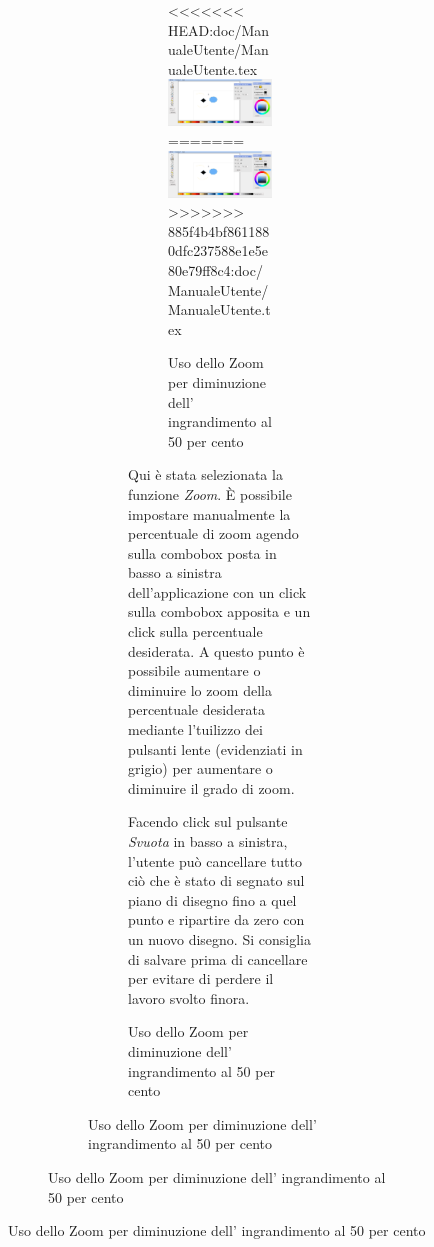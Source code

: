 \begin{figure}[!ht]
\begin{figure}[!ht]
\begin{figure}[!ht]
\begin{figure}[!ht]
\begin{figure}[!ht]
\centering
<<<<<<< HEAD:doc/ManualeUtente/ManualeUtente.tex
\includegraphics[scale=0.4]{images/zoom_meno.png}
=======
\includegraphics[scale=1]{images/zoom_meno.png}
>>>>>>> 885f4b4bf8611880dfc237588e1e5e80e79ff8c4:doc/ManualeUtente/ManualeUtente.tex
\caption{Uso dello Zoom per diminuzione dell' ingrandimento al 50 per cento}
\end{figure} 

\vspace{100pt}
Qui \`e stata selezionata la funzione \textit{Zoom}. \`E possibile impostare manualmente la percentuale di zoom agendo sulla combobox posta in basso a sinistra dell'applicazione con un click sulla combobox apposita e un click sulla percentuale desiderata. A questo punto è possibile aumentare o diminuire lo zoom della percentuale desiderata mediante l'tuilizzo dei pulsanti lente (evidenziati in grigio) per aumentare o diminuire il grado di zoom.
 

\vspace{100pt}
Facendo click sul pulsante \textit{Svuota} in basso a sinistra, l'utente pu\`o cancellare tutto ci\`o che \`e stato di segnato sul piano di disegno fino a quel punto e ripartire da zero con un nuovo disegno. Si consiglia di salvare prima di cancellare per evitare di perdere il lavoro svolto finora.


\end{figure}
\end{figure}
\end{figure}
\end{figure}
